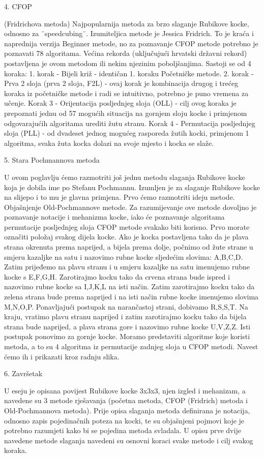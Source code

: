 4. CFOP

    (Fridrichova metoda) Najpopularnija metoda za brzo slaganje Rubikove kocke, odnosno za ¨speedcubing¨. Izumiteljica metode je Jessica Fridrich. To je kraća i naprednija verzija Beginner metode, no za poznavanje CFOP metode potrebno je poznavati 78 algoritama. Većina rekorda (uključujući hrvatski državni rekord) postavljena je ovom metodom ili nekim njezinim poboljšanjima. Sastoji se od 4 koraka: 1. korak - Bijeli križ - identičan 1. koraku Početničke metode. 2. korak - Prva 2 sloja (prva 2 sloja, F2L) - ovaj korak je kombinacija drugog i trećeg koraka iz početničke metode i radi se intuitivno, potrebno je puno vremena za učenje. Korak 3 - Orijentacija posljednjeg sloja (OLL) - cilj ovog koraka je prepoznati jednu od 57 mogućih situacija na gornjem sloju kocke i primjenom odgovarajućih algoritama urediti žutu stranu. Korak 4 - Permutacija posljednjeg sloja (PLL) - od dvadeset jednog mogućeg rasporeda žutih kocki, primjenom 1 algoritma, svaka žuta kocka dolazi na svoje mjesto i kocka se slaže.

5. Stara Pochmannova metoda

U ovom poglavlju ćemo razmotriti još jednu metodu slaganja Rubikove kocke koja je dobila ime po Stefanu Pochmannu. Izumljen je za slaganje Rubikove kocke na slijepo i to mu je glavna primjena. Prvo ćemo razmotriti ideju metode. Objašnjenje Old-Pochmannove metode. Za razumijevanje ove metode dovoljno je poznavanje notacije i mehanizma kocke, iako će poznavanje algoritama permutacije posljednjeg sloja CFOP metode svakako biti korisno. Prvo morate označiti položaj svakog dijela kocke. Ako je kocka postavljena tako da je plava strana okrenuta prema naprijed, a bijela prema dolje, počnimo od žute strane u smjeru kazaljke na satu i nazovimo rubne kocke sljedećim slovima: A,B,C,D. Zatim prijeđemo na plavu stranu i u smjeru kazaljke na satu imenujemo rubne kocke s E,F,G,H. Zarotirajmo kocku tako da crvena strana bude ispred i nazovimo rubne kocke sa I,J,K,L na isti način. Zatim zarotirajmo kocku tako da zelena strana bude prema naprijed i na isti način rubne kocke imenujemo slovima M,N,O,P. Ponavljajući postupak na narančastoj strani, dobivamo R,S,S,T. Na kraju, vratimo plavu stranu naprijed i zatim zarotirajmo kocku tako da bijela strana bude naprijed, a plava strana gore i nazovimo rubne kocke U,V,Z,Z. Isti postupak ponovimo za gornje kocke. Moramo predstaviti algoritme koje koristi metoda, a to su 4 algoritma iz permutacije zadnjeg sloja u CFOP metodi. Navest ćemo ih i prikazati kroz radnju slika.

6. Završetak

U eseju je opisana povijest Rubikove kocke 3x3x3, njen izgled i mehanizam, a navedene su 3 metode rješavanja (početna metoda, CFOP (Fridrich) metoda i Old-Pochmannova metoda). Prije opisa slaganja metoda definirana je notacija, odnosno zapis pojedinačnih poteza na kocki, te su objašnjeni pojmovi koje je potrebno razumjeti kako bi se pojedina metoda svladala. U opisu prve dvije navedene metode slaganja navedeni su osnovni koraci svake metode i cilj svakog koraka.
